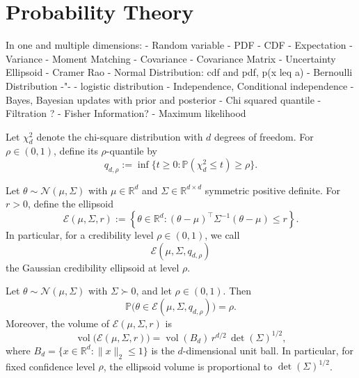 \documentclass{article}
\begin{document}
\section{Probability Theory}
In one and multiple dimensions:
- Random variable
- PDF
- CDF
- Expectation
- Variance
- Moment Matching
- Covariance
- Covariance Matrix
- Uncertainty Ellipsoid
- Cramer Rao
- Normal Distribution: cdf and pdf, p(x leq a)
- Bernoulli Distribution -"-
- logistic distribution
- Independence, Conditional independence
- Bayes, Bayesian updates with prior and posterior
- Chi squared quantile
- Filtration ?
- Fisher Information?
- Maximum likelihood
\begin{definition}
Let $\chi^2_d$ denote the chi-square distribution with $d$ degrees of freedom.
For $\rho \in (0,1)$, define its $\rho$-quantile by
\begin{equation*}
q_{d,\rho}
:=
\inf\{t \ge 0 : \mathbb P(\chi^2_d \le t) \ge \rho\}.
\end{equation*}
\end{definition}

\begin{definition}
Let $\theta \sim \mathcal N(\mu,\Sigma)$ with $\mu \in \mathbb R^d$ and
$\Sigma \in \mathbb R^{d\times d}$ symmetric positive definite. For $r>0$, define
the ellipsoid
\begin{equation*}
\mathcal E(\mu,\Sigma,r)
:=
\left\{
\theta \in \mathbb R^d :
(\theta-\mu)^\top \Sigma^{-1}(\theta-\mu) \le r
\right\}.
\end{equation*}
In particular, for a credibility level $\rho \in (0,1)$, we call
\begin{equation*}
\mathcal E(\mu,\Sigma,q_{d,\rho})
\end{equation*}
the Gaussian credibility ellipsoid at level $\rho$.
\end{definition}

\begin{proposition}
\label{prop:gaussian_ellipsoid}
Let $\theta \sim \mathcal N(\mu,\Sigma)$ with $\Sigma \succ 0$, and let
$\rho \in (0,1)$. Then
\begin{equation*}
\mathbb P\!\bigl(\theta \in \mathcal E(\mu,\Sigma,q_{d,\rho})\bigr)=\rho.
\end{equation*}
Moreover, the volume of $\mathcal E(\mu,\Sigma,r)$ is
\begin{equation*}
\operatorname{vol}\!\bigl(\mathcal E(\mu,\Sigma,r)\bigr)
=
\operatorname{vol}(B_d)\, r^{d/2}\, \det(\Sigma)^{1/2},
\end{equation*}
where $B_d=\{x\in\mathbb R^d:\|x\|_2\le 1\}$ is the $d$-dimensional unit ball.
In particular, for fixed confidence level $\rho$, the ellipsoid volume is proportional
to $\det(\Sigma)^{1/2}$.
\end{proposition}
\end{document}

